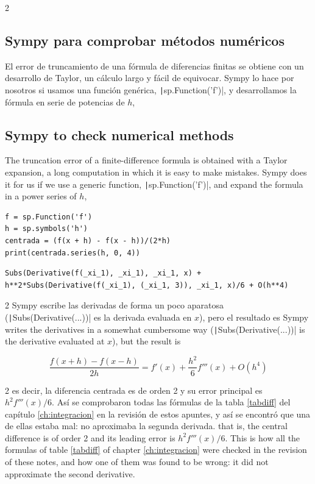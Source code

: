 \begin{paracol}{2}
\subsection{Sympy para comprobar métodos numéricos}
El error de truncamiento de una fórmula de diferencias finitas se obtiene con un desarrollo de Taylor, un cálculo largo y fácil de equivocar. Sympy lo hace por nosotros si usamos una función genérica, \texttt|sp.Function('f')|, y desarrollamos la fórmula en serie de potencias de $h$,
\switchcolumn
\subsection{Sympy to check numerical methods}
The truncation error of a finite-difference formula is obtained with a Taylor expansion, a long computation in which it is easy to make mistakes. Sympy does it for us if we use a generic function, \texttt|sp.Function('f')|, and expand the formula in a power series of $h$,
\end{paracol}
\begin{verbatim}
f = sp.Function('f')
h = sp.symbols('h')
centrada = (f(x + h) - f(x - h))/(2*h)
print(centrada.series(h, 0, 4))
\end{verbatim}
\begin{verbatim}
Subs(Derivative(f(_xi_1), _xi_1), _xi_1, x) + h**2*Subs(Derivative(f(_xi_1), (_xi_1, 3)), _xi_1, x)/6 + O(h**4)
\end{verbatim}
\begin{paracol}{2}
Sympy escribe las derivadas de forma un poco aparatosa (\texttt|Subs(Derivative(...))| es la derivada evaluada en $x$), pero el resultado es
\switchcolumn
Sympy writes the derivatives in a somewhat cumbersome way (\texttt|Subs(Derivative(...))| is the derivative evaluated at $x$), but the result is
\end{paracol}
\begin{equation*}
\frac{f(x+h)-f(x-h)}{2h} = f'(x) + \frac{h^2}{6}f'''(x) + O(h^4)
\end{equation*}
\begin{paracol}{2}
\noindent es decir, la diferencia centrada es de orden 2 y su error principal es $h^2f'''(x)/6$. Así se comprobaron todas las fórmulas de la tabla \ref{tabdiff} del capítulo \ref{ch:integracion} en la revisión de estos apuntes, y así se encontró que una de ellas estaba mal: no aproximaba la segunda derivada.
\switchcolumn
\noindent that is, the central difference is of order 2 and its leading error is $h^2f'''(x)/6$. This is how all the formulas of table \ref{tabdiff} of chapter \ref{ch:integracion} were checked in the revision of these notes, and how one of them was found to be wrong: it did not approximate the second derivative.
\end{paracol}

